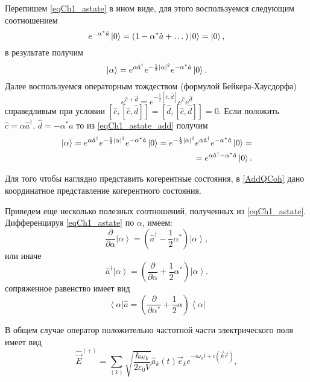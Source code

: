 Перепишем \eqref{eqCh1_astate} в ином виде, для этого воспользуемся
следующим соотношением
\[
e^{- \alpha^{*} \hat{a}} \ket{0} = \left(1 - \alpha^{*} \hat{a} +
\dots\right) \ket{0} = \ket{0},
\]
в результате получим
\begin{equation}
\left|\alpha\right> = 
e^{\alpha \hat{a}^{\dag}} 
e^{-\frac{1}{2}\left|\alpha\right|^2}
e^{- \alpha^{*} \hat{a}} 
\ket{0}.
\label{eqCh1_astate_add}
\end{equation}
Далее воспользуемся операторным тождеством (формулой Бейкера-Хаусдорфа)
\begin{equation}
e^{\hat{c} + \hat{d}} = e^{- \frac{1}{2}\left[\hat{c},
    \hat{d}\right]}e^{\hat{c}} e^{\hat{d}} 
\label{eqPart1Ch1_BeikerHausdorf}
\end{equation}
справедливым при условии  
$\left[\hat{c},\left[\hat{c}, \hat{d}\right]\right] =
\left[\hat{d},\left[\hat{c}, \hat{d}\right]\right] = 0$.
Если положить $\hat{c} = \alpha\hat{a}^{\dag}$, $\hat{d} = -\alpha^*\hat{a}$
то из \eqref{eqCh1_astate_add}  получим 
\begin{eqnarray}
\left|\alpha\right> =  
e^{\alpha \hat{a}^{\dag}} 
e^{-\frac{1}{2}\left|\alpha\right|^2}
e^{- \alpha^{*} \hat{a}} 
\ket{0} =
e^{-\frac{1}{2}\left|\alpha\right|^2}
e^{\alpha \hat{a}^{\dag}} 
e^{- \alpha^{*} \hat{a}} 
\ket{0} = 
\nonumber \\
=
e^{\alpha \hat{a}^{\dag} - \alpha^{*} \hat{a}}\ket{0}.
\label{eqCh1_astate4squeezed}
\end{eqnarray}

Для того чтобы наглядно представить когерентные состояния, в
\autoref{AddQCoh} дано координатное представление когерентного состояния. 

Приведем еще несколько полезных соотношений, полученных из
\eqref{eqCh1_astate}. Дифференцируя \eqref{eqCh1_astate} по  $\alpha$,
имеем:  
\[
\frac{\partial}{\partial \alpha}\left|\alpha\right> = 
\left( \hat{a}^{\dag} - \frac{1}{2}\alpha^{*}\right)\left|\alpha\right>,
\]
или иначе 
\[
\hat{a}^{\dag}\left|\alpha\right> = \left(\frac{\partial}{\partial
  \alpha} +  \frac{1}{2}\alpha^{*}\right)\left|\alpha\right>.
\]
сопряженное равенство имеет вид
\[
\left<\alpha\right|\hat{a} = \left(\frac{\partial}{\partial
  \alpha^{*}} +  \frac{1}{2}\alpha\right)\left<\alpha\right|
\]

В общем случае оператор положительно частотной части электрического поля имеет вид
\[
\hat{\vec{E}}^{(+)} = \sum_{(k)} \sqrt{\frac{\hbar \omega_k}{2 \varepsilon_0
V}} \hat{a}_k\left(t\right) \vec{e}_k e^{-i \omega_k t + i \left(\vec{k}\vec{r}
  \right)}, 
\]

